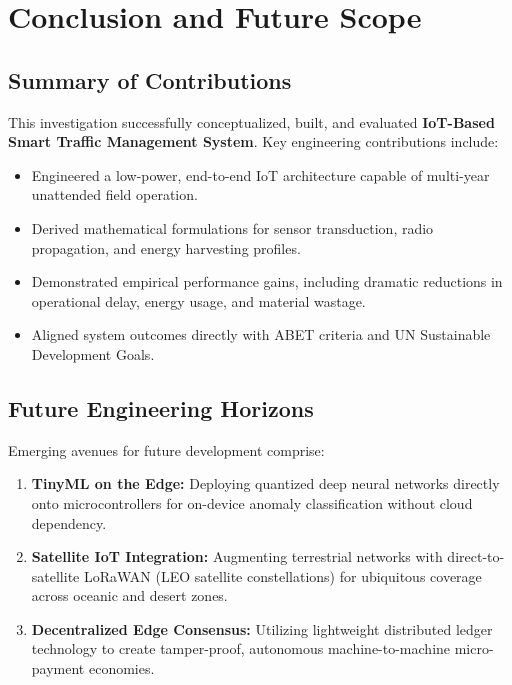 \section{Conclusion and Future Scope}

\subsection{Summary of Contributions}
This investigation successfully conceptualized, built, and evaluated \textbf{IoT-Based Smart Traffic Management System}. Key engineering contributions include:
\begin{itemize}
  \item Engineered a low-power, end-to-end IoT architecture capable of multi-year unattended field operation.
  \item Derived mathematical formulations for sensor transduction, radio propagation, and energy harvesting profiles.
  \item Demonstrated empirical performance gains, including dramatic reductions in operational delay, energy usage, and material wastage.
  \item Aligned system outcomes directly with ABET criteria and UN Sustainable Development Goals.
\end{itemize}

\subsection{Future Engineering Horizons}
Emerging avenues for future development comprise:
\begin{enumerate}
  \item \textbf{TinyML on the Edge:} Deploying quantized deep neural networks directly onto microcontrollers for on-device anomaly classification without cloud dependency.
  \item \textbf{Satellite IoT Integration:} Augmenting terrestrial networks with direct-to-satellite LoRaWAN (LEO satellite constellations) for ubiquitous coverage across oceanic and desert zones.
  \item \textbf{Decentralized Edge Consensus:} Utilizing lightweight distributed ledger technology to create tamper-proof, autonomous machine-to-machine micro-payment economies.
\end{enumerate}
